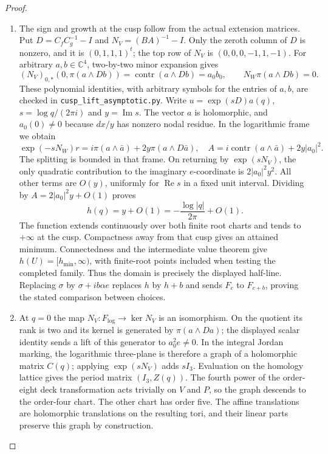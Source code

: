 \documentclass[11pt,a4paper]{article}
\theoremstyle{definition}
\begin{document}
\begin{proof}
\begin{enumerate}[label=\arabic*.]
\item The sign and growth at the cusp follow from the actual extension
matrices.  Put $D=C_fC_g^{-1}-I$ and $N_V=(BA)^{-1}-I$.
Only the zeroth column of $D$ is nonzero, and it is $(0,1,1,1)^t$;
the top row of $N_V$ is $(0,0,0,-1,1,-1)$.
For arbitrary $a,b\in\mathbb C^4$, two-by-two minor expansion gives
\[
(N_V)_{0,*}(0,\pi(a\wedge Db))
 =\operatorname{contr}(a\wedge Db)=a_0b_0,
 \qquad N_W\pi(a\wedge Db)=0.
\]
These polynomial identities, with arbitrary symbols for the entries of
$a,b$, are checked in \texttt{cusp\_lift\_asymptotic.py}.
Write $u=\exp(sD)a(q)$, $s=\log q/(2\pi i)$ and $y=\operatorname{Im}s$.
The vector $a$ is holomorphic, and $a_0(0)\ne0$ because $dx/y$ has
nonzero nodal residue.  In the logarithmic frame we obtain
\[
\exp(-sN_W)r=i\pi(a\wedge\bar a)+2y\pi(a\wedge D\bar a),
\quad
A=i\operatorname{contr}(a\wedge\bar a)+2y|a_0|^2.
\]
The splitting is bounded in that frame.  On returning by
$\exp(sN_V)$, the only quadratic contribution to the imaginary
$e$-coordinate is $2|a_0|^2y^2$.  All other terms are $O(y)$,
uniformly for $\operatorname{Re}s$ in a fixed unit interval.
Dividing by $A=2|a_0|^2y+O(1)$ proves
\[
h(q)=y+O(1)=-\frac{\log|q|}{2\pi}+O(1).
\]
The function extends continuously over both finite root charts and
tends to $+\infty$ at the cusp.  Compactness away from that cusp gives
an attained minimum.  Connectedness and the intermediate value
theorem give $h(U)=[h_{\min},\infty)$, with finite-root points included
when testing the completed family.  Thus the domain is precisely the
displayed half-line.  Replacing $\sigma$ by $\sigma+ib\alpha e$ replaces
$h$ by $h+b$ and sends $F_c$ to $F_{c+b}$, proving the stated
comparison between choices.

\item At $q=0$ the map $N_V:F_{\log}\to\ker N_V$ is an isomorphism.
On the quotient its rank is two and its kernel is generated by
$\pi(a\wedge Da)$; the displayed scalar identity sends a lift of this
generator to $a_0^2e\ne0$.  In the integral Jordan marking, the
logarithmic three-plane is therefore a graph of a holomorphic matrix
$C(q)$; applying $\exp(sN_V)$ adds $sI_3$.  Evaluation on the homology
lattice gives the period matrix $(I_3,Z(q))$.
The fourth power of the order-eight deck transformation acts trivially
on $V$ and $P$, so the graph descends to the order-four chart.
The other chart has order five.  The affine translations are
holomorphic translations on the resulting tori, and their linear
parts preserve this graph by construction.

\end{enumerate}
\end{proof}
\end{document}
